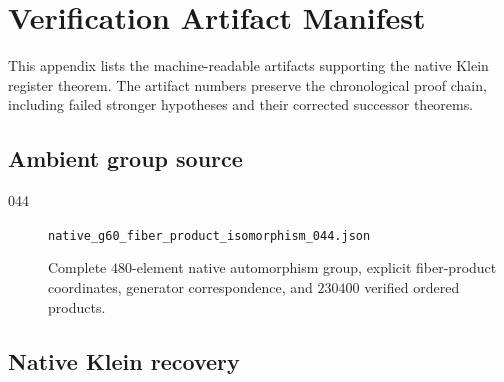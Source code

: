 \section{Verification Artifact Manifest}

This appendix lists the machine-readable artifacts supporting the
native Klein register theorem. The artifact numbers preserve the
chronological proof chain, including failed stronger hypotheses and
their corrected successor theorems.

\subsection{Ambient group source}

\begin{description}
    \item[044]
    \texttt{native\_g60\_fiber\_product\_isomorphism\_044.json}

    Complete \(480\)-element native automorphism group, explicit
    fiber-product coordinates, generator correspondence, and
    \(230400\) verified ordered products.
\end{description}

\subsection{Native Klein recovery}

